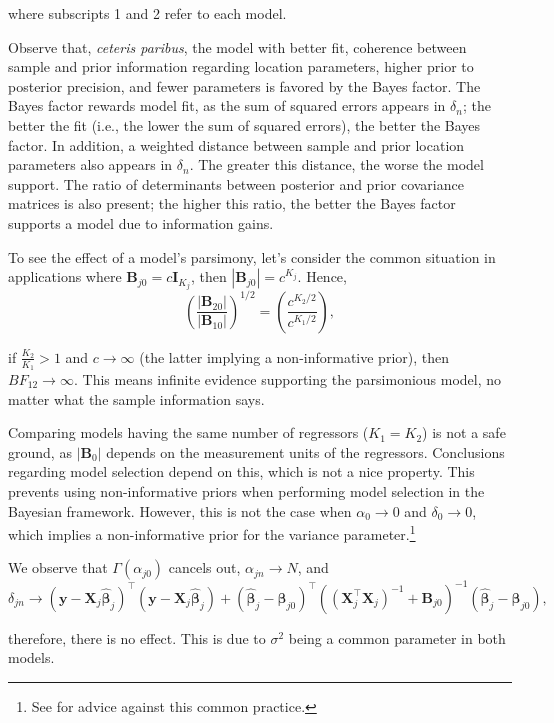 where subscripts 1 and 2 refer to each model.

Observe that, \textit{ceteris paribus}, the model with better fit, coherence between sample and prior information regarding location parameters, higher prior to posterior precision, and fewer parameters is favored by the Bayes factor. The Bayes factor rewards model fit, as the sum of squared errors appears in \( \delta_n \); the better the fit (i.e., the lower the sum of squared errors), the better the Bayes factor. In addition, a weighted distance between sample and prior location parameters also appears in \( \delta_n \). The greater this distance, the worse the model support. The ratio of determinants between posterior and prior covariance matrices is also present; the higher this ratio, the better the Bayes factor supports a model due to information gains.

To see the effect of a model's parsimony, let's consider the common situation in applications where \( \bm{B}_{j0} = c \bm{I}_{K_j} \), then \( | \bm{B}_{j0} | = c^{K_j} \). Hence, 
\[
\left( \frac{| \bm{B}_{20} |}{| \bm{B}_{10} |} \right)^{1/2} = \left( \frac{c^{K_2/2}}{c^{K_1/2}} \right),
\]

if \( \frac{K_2}{K_1} > 1 \) and \( c \to \infty \) (the latter implying a non-informative prior), then \( BF_{12} \to \infty \). This means infinite evidence supporting the parsimonious model, no matter what the sample information says.

Comparing models having the same number of regressors (\( K_1 = K_2 \)) is not a safe ground, as \( | \bm{B}_0 | \) depends on the measurement units of the regressors. Conclusions regarding model selection depend on this, which is not a nice property. This prevents using non-informative priors when performing model selection in the Bayesian framework. However, this is not the case when \( \alpha_0 \to 0 \) and \( \delta_0 \to 0 \), which implies a non-informative prior for the variance parameter.\footnote{See \cite{gelman2006prior} for advice against this common practice.}

We observe that \( \Gamma(\alpha_{j0}) \) cancels out, \( \alpha_{jn} \to N \), and 
\[
\delta_{jn} \to ({\bm{y}} - {\bm{X}}_j \hat{\bm{\beta}}_j)^{\top} ({\bm{y}} - {\bm{X}}_j \hat{\bm{\beta}}_j) + (\hat{\bm{\beta}}_j - \bm{\beta}_{j0})^{\top} \left( ({\bm{X}}_j^{\top} {\bm{X}}_j)^{-1} + \bm{B}_{j0} \right)^{-1} (\hat{\bm{\beta}}_j - \bm{\beta}_{j0}),
\]

therefore, there is no effect. This is due to \( \sigma^2 \) being a common parameter in both models.

